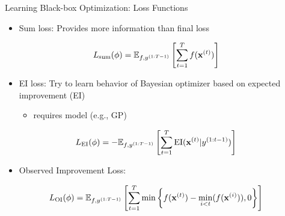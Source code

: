 \begin{frame}[c]{Learning Black-box Optimization: Loss Functions\newline {}}

\begin{itemize}
\item Sum loss: Provides more information than final loss
\end{itemize}
\begin{equation}
L_{\text{sum}}(\phi) = \mathbb{E}_{f,y^{(1:T-1)}}\left[\sum_{t=1}^T f(\mathbf{x}^{(t)})\right]\nonumber
\end{equation}

\pause

\begin{itemize}
\item EI loss: Try to learn behavior of Bayesian optimizer based on expected improvement (EI)
\begin{itemize}
\item requires model (e.g., GP)
\end{itemize}
\end{itemize}
\begin{equation}
L_{\text{EI}}(\phi) = - \mathbb{E}_{f,y^{(1:T-1)}}\left[\sum_{t=1}^T \text{EI}(\mathbf{x}^{(t)} | y^{(1:t-1)})\right]\nonumber
\end{equation}

\pause

\begin{itemize}
\item Observed Improvement Loss:
\end{itemize}

\begin{equation}
L_{\text{OI}}(\phi) = \mathbb{E}_{f,y^{(1:T-1)}}\left[\sum_{t=1}^T \min \left\{f(\mathbf{x}^{(t)}) - \min_{i<t}(f(\mathbf{x}^{(i)})),0 \right\}  \right]\nonumber
\end{equation}

\end{frame}
